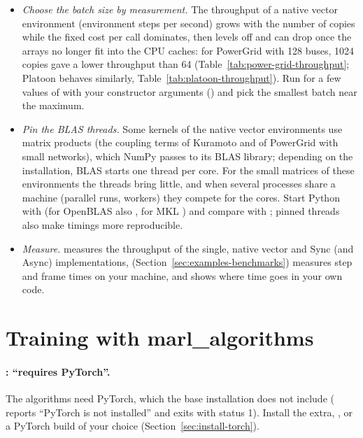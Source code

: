 \begin{itemize}
    all of them with one set of array operations; a  steps
    them one by one, and an  pays inter-process
    communication on every step, which only an expensive step (AJLATT,
    Pistonball) outweighs.
  \item \emph{Choose the batch size by measurement.} The throughput of a
    native vector environment (environment steps per second) grows with the
    number of copies while the fixed cost per call dominates, then levels off
    and can drop once the arrays no longer fit into the CPU caches: for
    PowerGrid with 128 buses, 1024 copies gave a lower throughput than 64
    (Table~\ref{tab:power-grid-throughput}; Platoon behaves similarly,
    Table~\ref{tab:platoon-throughput}). Run
     for a few values of  with your
    constructor arguments () and pick the smallest batch near the
    maximum.
  \item \emph{Pin the BLAS threads.} Some kernels of the native vector
    environments use matrix products (the coupling terms of Kuramoto and of
    PowerGrid with small networks), which NumPy passes to its BLAS library;
    depending on the installation, BLAS starts one thread per core. For the
    small matrices of these environments the threads bring little, and when
    several processes share a machine (parallel runs, 
    workers) they compete for the cores. Start Python with
     (for OpenBLAS also
    , for MKL ) and
    compare with ; pinned threads also make timings more
    reproducible.
  \item \emph{Measure.}  measures the throughput of the
    single, native vector and Sync (and Async) implementations,
     (Section~\ref{sec:examples-benchmarks})
    measures step and frame times on your machine, and
     shows where time goes in
    your own code.
\end{itemize}

\section{Training with marl\_algorithms}\label{sec:trouble-marl}

\paragraph{: ``requires PyTorch''.} The algorithms need
PyTorch, which the base installation does not include (
reports ``PyTorch is not installed'' and exits with status 1). Install the extra,
, or a PyTorch build of your choice
(Section~\ref{sec:install-torch}).

